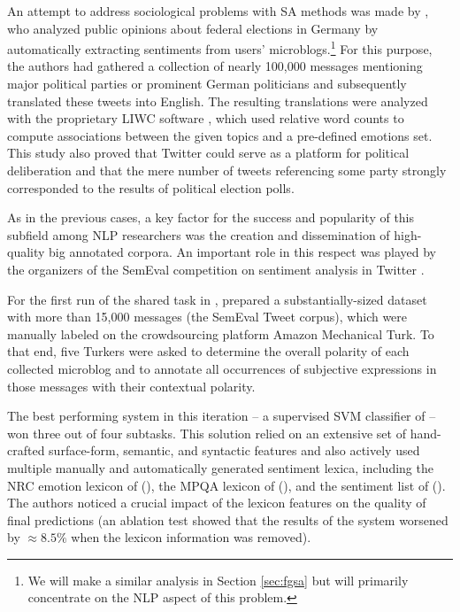 An attempt to address sociological problems with SA methods was made
by \citet{Tumasjan:10}, who analyzed public opinions about federal
elections in Germany by automatically extracting sentiments from
users' microblogs.\footnote{We will make a similar analysis in Section
  \ref{sec:fgsa} but will primarily concentrate on the NLP aspect of
  this problem.}  For this purpose, the authors had gathered a
collection of nearly 100,000 messages mentioning major political
parties or prominent German politicians and subsequently translated
these tweets into English.  The resulting translations were analyzed
with the proprietary LIWC software \cite{Pannebaker:07}, which used
relative word counts to compute associations between the given topics
and a pre-defined emotions set.  This study also proved that Twitter
could serve as a platform for political deliberation and that the mere
number of tweets referencing some party strongly corresponded to the
results of political election polls.

As in the previous cases, a key factor for the success and popularity
of this subfield among NLP researchers was the creation and
dissemination of high-quality big annotated corpora.  An important
role in this respect was played by the organizers of the SemEval
competition on sentiment analysis in Twitter
\cite{Nakov:13,Rosenthal:14,Rosenthal:15}.

For the first run of the shared task in \citeyear{Nakov:13},
\citet{Nakov:13} prepared a substantially-sized dataset with more than
15,000 messages (the SemEval Tweet corpus), which were manually
labeled on the crowdsourcing platform Amazon Mechanical Turk.  To that
end, five Turkers were asked to determine the overall polarity of each
collected microblog and to annotate all occurrences of subjective
expressions in those messages with their contextual polarity.

The best performing system in this iteration -- a supervised SVM
classifier of \citet{Mohammad:13} -- won three out of four subtasks.
This solution relied on an extensive set of hand-crafted surface-form,
semantic, and syntactic features and also actively used multiple
manually and automatically generated sentiment lexica, including the
NRC emotion lexicon of \citeauthor{Mohammad:13a}
(\citeyear{Mohammad:13a}), the MPQA lexicon of \citeauthor{Wilson:05}
(\citeyear{Wilson:05}), and the sentiment list of \citeauthor{Hu:04}
(\citeyear{Hu:04}).  The authors noticed a crucial impact of the
lexicon features on the quality of final predictions (an ablation test
showed that the results of the system worsened by $\approx8.5\%$ when
the lexicon information was removed).

